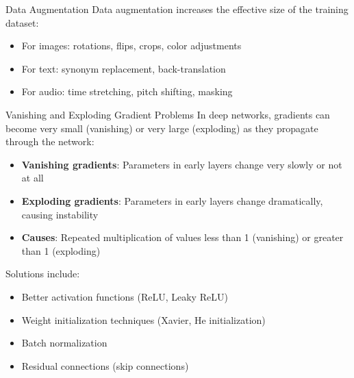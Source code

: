 \begin{definition}{Data Augmentation}
Data augmentation increases the effective size of the training dataset:
\begin{itemize}
    \item For images: rotations, flips, crops, color adjustments
    \item For text: synonym replacement, back-translation
    \item For audio: time stretching, pitch shifting, masking
\end{itemize}
\end{definition}

\multend

\begin{concept}{Vanishing and Exploding Gradient Problems}
In deep networks, gradients can become very small (vanishing) or very large (exploding) as they propagate through the network:
\begin{itemize}
    \item \textbf{Vanishing gradients}: Parameters in early layers change very slowly or not at all
    \item \textbf{Exploding gradients}: Parameters in early layers change dramatically, causing instability
    \item \textbf{Causes}: Repeated multiplication of values less than 1 (vanishing) or greater than 1 (exploding)
\end{itemize}
Solutions include:
\begin{itemize}
    \item Better activation functions (ReLU, Leaky ReLU)
    \item Weight initialization techniques (Xavier, He initialization)
    \item Batch normalization
    \item Residual connections (skip connections)
\end{itemize}
\end{concept}

